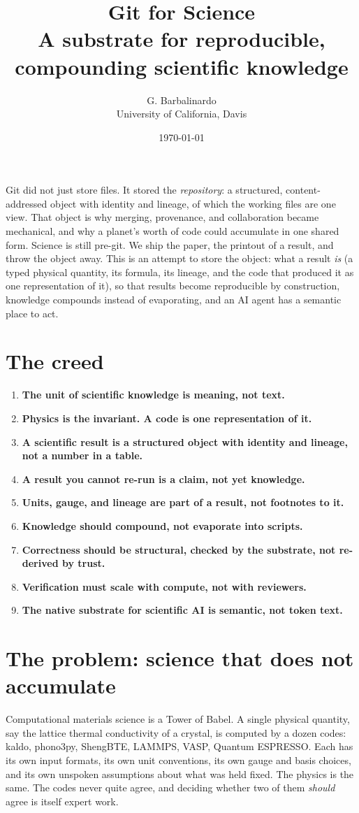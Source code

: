 \documentclass[11pt,a4paper]{article}
\title{\textbf{Git for Science}\\[0.3em]
       \large\normalfont A substrate for reproducible, compounding scientific knowledge}
\author{G. Barbalinardo\\\small University of California, Davis}
\date{\today}
\newcommand{\creed}[1]{\item \textbf{#1}}
\begin{document}
\maketitle
\thispagestyle{empty}

\noindent
Git did not just store files. It stored the \emph{repository}: a structured,
content-addressed object with identity and lineage, of which the working files
are one view. That object is why merging, provenance, and collaboration became
mechanical, and why a planet's worth of code could accumulate in one shared form.
Science is still pre-git. We ship the paper, the printout of a result, and throw
the object away. This is an attempt to store the object: what a result
\emph{is} (a typed physical quantity, its formula, its lineage, and the code that
produced it as one representation of it), so that results become reproducible by
construction, knowledge compounds instead of evaporating, and an AI agent has a
semantic place to act.

\section*{\color{abstrcol}The creed}
\begin{enumerate}[leftmargin=1.4em, itemsep=0.35em]
  \creed{The unit of scientific knowledge is meaning, not text.}
  \creed{Physics is the invariant. A code is one representation of it.}
  \creed{A scientific result is a structured object with identity and lineage, not a number in a table.}
  \creed{A result you cannot re-run is a claim, not yet knowledge.}
  \creed{Units, gauge, and lineage are part of a result, not footnotes to it.}
  \creed{Knowledge should compound, not evaporate into scripts.}
  \creed{Correctness should be structural, checked by the substrate, not re-derived by trust.}
  \creed{Verification must scale with compute, not with reviewers.}
  \creed{The native substrate for scientific AI is semantic, not token text.}
\end{enumerate}

\section{The problem: science that does not accumulate}

Computational materials science is a Tower of Babel. A single physical quantity,
say the lattice thermal conductivity of a crystal, is computed by a dozen codes:
kaldo, phono3py, ShengBTE, LAMMPS, VASP, Quantum ESPRESSO. Each has its own input
formats, its own unit conventions, its own gauge and basis choices, and its own
unspoken assumptions about what was held fixed. The physics is the same. The codes
never quite agree, and deciding whether two of them \emph{should} agree is itself
expert work.
\end{document}
